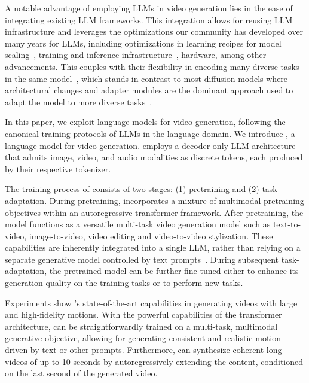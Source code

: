 A notable advantage of employing LLMs in video generation  
lies in the ease of integrating existing LLM frameworks. 
%
This integration allows for reusing LLM infrastructure and leverages the optimizations our community has developed over many years for LLMs, including optimizations in learning recipes for model scaling~\cite{brown2020language,chowdhery2022palm}, training and inference infrastructure~\cite{du2022glam}, hardware, among other advancements.
%
This couples with their flexibility in encoding many diverse tasks in the same model~\cite{raffel2020exploring},
which stands in contrast to most diffusion models where architectural changes and adapter modules are the dominant approach used to adapt the model to more diverse tasks~\cite{zhang2023adding}.

In this paper, we exploit language models for video generation, following the canonical training protocols of LLMs in the language domain.
We introduce \emph{\modelname{}}, a language model for video generation. \modelname{} employs a decoder-only LLM architecture~\cite{anil2023palm,openai2023gpt4} that admits image, video, and audio modalities as discrete tokens, each produced by their respective tokenizer.

The training process of \modelname{} consists of two stages: (1) pretraining and (2) task-adaptation.
%
During pretraining, \modelname{} incorporates a mixture of multimodal pretraining objectives within an autoregressive transformer framework.
%
After pretraining, the model functions as a versatile multi-task video generation model such as text-to-video, image-to-video, video editing and video-to-video stylization.
%
These capabilities are inherently integrated into a single LLM, rather than relying on a separate generative model controlled by text prompts~\citep{tang2023any}.
%
During subsequent task-adaptation, the pretrained model can be further fine-tuned either to enhance its generation quality on the training tasks or to perform new tasks.

Experiments show \modelname{}'s state-of-the-art capabilities in generating videos with large and high-fidelity motions. 
%
With the powerful capabilities of the transformer architecture, \modelname{} can be straightforwardly trained on a multi-task, multimodal generative objective, allowing for generating consistent and realistic motion driven by text or other prompts. 
%
Furthermore, \modelname{} can synthesize coherent long videos of up to 10 seconds by autoregressively extending the content, conditioned on the last second of the generated video. 
%

